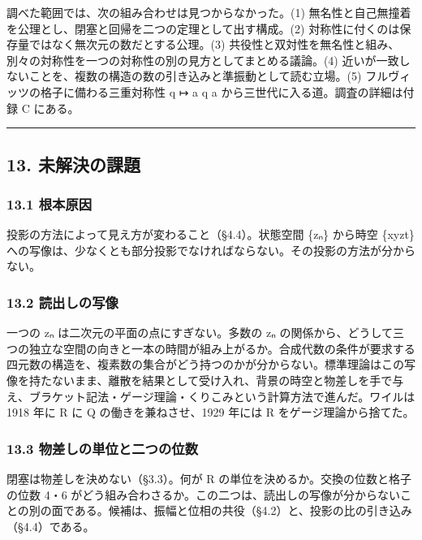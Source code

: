 \documentclass[
  a4paper,
]{ltjsarticle}
\begin{document}
調べた範囲では、次の組み合わせは見つからなかった。(1)
無名性と自己無撞着を公理とし、閉塞と回帰を二つの定理として出す構成。(2)
対称性に付くのは保存量ではなく無次元の数だとする公理。(3)
共役性と双対性を無名性と組み、別々の対称性を一つの対称性の別の見方としてまとめる議論。(4)
近いが一致しないことを、複数の構造の数の引き込みと準振動として読む立場。(5)
フルヴィッツの格子に備わる三重対称性 q ↦ a q a
から三世代に入る道。調査の詳細は付録 C にある。

\begin{center}\rule{0.5\linewidth}{0.5pt}\end{center}

\subsection{13.
未解決の課題}\label{ux672aux89e3ux6c7aux306eux8ab2ux984c}

\subsubsection{13.1 根本原因}\label{ux6839ux672cux539fux56e0}

投影の方法によって見え方が変わること（§4.4）。状態空間 \{zₙ\} から時空
\{xyzt\}
への写像は、少なくとも部分投影でなければならない。その投影の方法が分からない。

\subsubsection{13.2
読出しの写像}\label{ux8aadux51faux3057ux306eux5199ux50cf}

一つの zₙ は二次元の平面の点にすぎない。多数の zₙ
の関係から、どうして三つの独立な空間の向きと一本の時間が組み上がるか。合成代数の条件が要求する四元数の構造を、複素数の集合がどう持つのかが分からない。標準理論はこの写像を持たないまま、離散を結果として受け入れ、背景の時空と物差しを手で与え、ブラケット記法・ゲージ理論・くりこみという計算方法で進んだ。ワイルは
1918 年に R に Q の働きを兼ねさせ、1929 年には R
をゲージ理論から捨てた。

\subsubsection{13.3
物差しの単位と二つの位数}\label{ux7269ux5deeux3057ux306eux5358ux4f4dux3068ux4e8cux3064ux306eux4f4dux6570}

閉塞は物差しを決めない（§3.3）。何が R
の単位を決めるか。交換の位数と格子の位数 4・6
がどう組み合わさるか。この二つは、読出しの写像が分からないことの別の面である。候補は、振幅と位相の共役（§4.2）と、投影の比の引き込み（§4.4）である。
\end{document}
